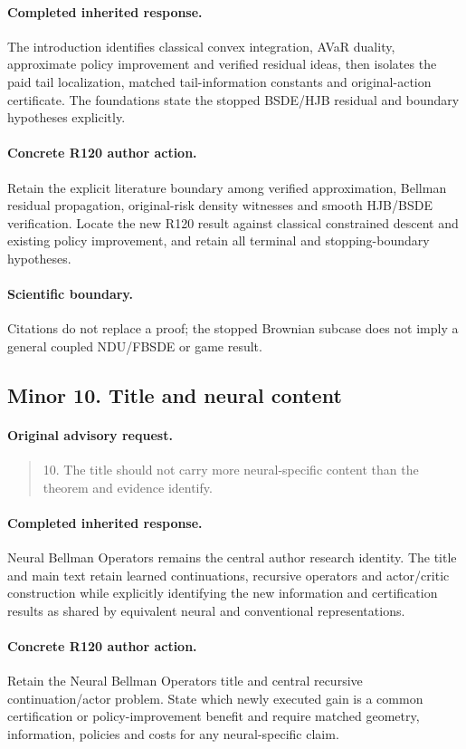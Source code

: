 \paragraph{Completed inherited response.}
The introduction identifies classical convex integration, AVaR duality, approximate policy improvement and verified residual ideas, then isolates the paid tail localization, matched tail-information constants and original-action certificate. The foundations state the stopped BSDE/HJB residual and boundary hypotheses explicitly.
\paragraph{Concrete R120 author action.}
Retain the explicit literature boundary among verified approximation, Bellman residual propagation, original-risk density witnesses and smooth HJB/BSDE verification. Locate the new R120 result against classical constrained descent and existing policy improvement, and retain all terminal and stopping-boundary hypotheses.
\paragraph{Scientific boundary.}
Citations do not replace a proof; the stopped Brownian subcase does not imply a general coupled NDU/FBSDE or game result.

\subsection{Minor 10. Title and neural content}
\label{response120:minor-10}
\paragraph{Original advisory request.}
\begin{quote}
10. The title should not carry more neural-specific content than the theorem and evidence identify.
\end{quote}
\paragraph{Completed inherited response.}
Neural Bellman Operators remains the central author research identity. The title and main text retain learned continuations, recursive operators and actor/critic construction while explicitly identifying the new information and certification results as shared by equivalent neural and conventional representations.
\paragraph{Concrete R120 author action.}
Retain the Neural Bellman Operators title and central recursive continuation/actor problem. State which newly executed gain is a common certification or policy-improvement benefit and require matched geometry, information, policies and costs for any neural-specific claim.
